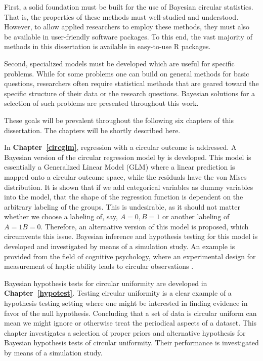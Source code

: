 \documentclass[12pt, a4paper]{book}\usepackage[]{graphicx}\usepackage[]{color}
\begin{document}
First, a solid foundation must be built for the use of Bayesian circular statistics. That is, the properties of these methods must well-studied and understood. However, to allow applied researchers to employ these methods, they must also be available in user-friendly software packages. To this end, the vast majority of methods in this dissertation is available in easy-to-use R packages.

Second, specialized models must be developed which are useful for specific problems. While for some problems one can build on general methods for basic questions, researchers often require statistical methods that are geared toward the specific structure of their data or the research questions. Bayesian solutions for a selection of such problems are presented throughout this work.

These goals will be prevalent throughout the following six chapters of this dissertation. The chapters will be shortly described here.

In \textbf{Chapter~\ref{circglm}}, regression with a circular outcome is addressed. A Bayesian version of the circular regression model by \citet{fisher1992regression} is developed. This model is essentially a Generalized Linear Model (GLM) where a linear prediction is mapped onto a circular outcome space, while the residuals have the von Mises distribution. It is shown that if we add categorical variables as dummy variables into the model, that the shape of the regression function is dependent on the arbitrary labeling of the groups. This is undesirable, as it should not matter whether we choose a labeling of, say, $A = 0, B = 1$ or another labeling of $A = 1 B = 0.$ Therefore, an alternative version of this model is proposed, which circumvents this issue. Bayesian inference and hypothesis testing for this model is developed and investigated by means of a simulation study. An example is provided from the field of cognitive psychology, where an experimental design for measurement of haptic ability leads to circular observations \citep{van2013superior}.

Bayesian hypothesis tests for circular uniformity are developed in \textbf{Chapter~\ref{hypotest}}. Testing circular uniformity is a clear example of a hypothesis testing setting where one might be interested in finding evidence in favor of the null hypothesis. Concluding that a set of data is circular uniform can mean we might ignore or otherwise treat the periodical aspects of a dataset. This chapter investigates a selection of proper priors and alternative hypothesis for Bayesian hypothesis tests of circular uniformity. Their performance is investigated by means of a simulation study.
\end{document}

